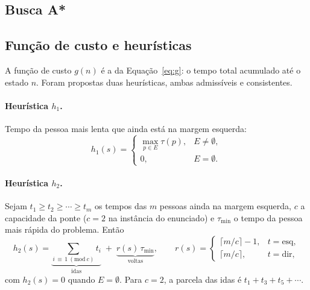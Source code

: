 \documentclass[12pt,a4paper]{article}
\newcommand{\Esq}{E}
\begin{document}
\subsection{Busca A*}
\label{sec:astar}

\subsection{Função de custo e heurísticas}
\label{sec:heuristicas}

A função de custo $g(n)$ é a da Equação~\eqref{eq:g}: o tempo total acumulado até o estado $n$. Foram propostas duas heurísticas, ambas admissíveis e consistentes.

\paragraph{Heurística $h_1$.} Tempo da pessoa mais lenta que ainda está na margem esquerda:
\begin{equation}
  h_1(s) = \begin{cases}
    \max_{p \in \Esq} \tau(p), & \Esq \neq \emptyset,\\
    0, & \Esq = \emptyset.
  \end{cases}
  \label{eq:h1}
\end{equation}


\paragraph{Heurística $h_2$.} Sejam $t_1 \ge t_2 \ge \cdots \ge t_m$ os tempos das $m$ pessoas ainda na margem esquerda, $c$ a capacidade da ponte ($c = 2$ na instância do enunciado) e $\tau_{\min}$ o tempo da pessoa mais rápida do problema. Então
\begin{equation}
  h_2(s) = \underbrace{\sum_{i \,\equiv\, 1 \ (\mathrm{mod}\ c)} t_i}_{\text{idas}}
         \;+\;
         \underbrace{r(s)\,\tau_{\min}}_{\text{voltas}},
  \qquad
  r(s) = \begin{cases}
    \lceil m/c \rceil - 1, & t = \text{esq},\\
    \lceil m/c \rceil,     & t = \text{dir},
  \end{cases}
  \label{eq:h2}
\end{equation}
com $h_2(s) = 0$ quando $\Esq = \emptyset$. Para $c=2$, a parcela das idas é $t_1 + t_3 + t_5 + \cdots$.
\end{document}
